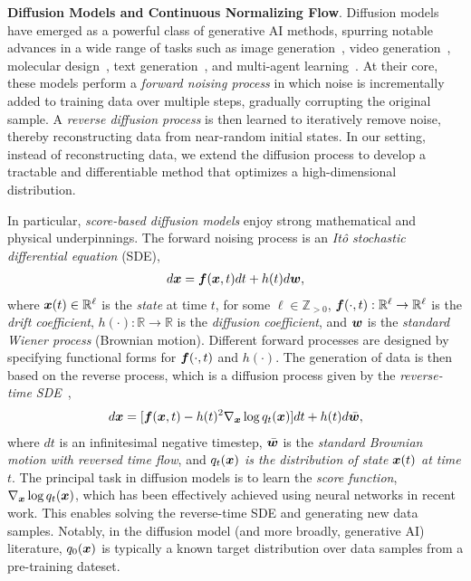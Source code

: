 

\textbf{Diffusion Models and Continuous Normalizing Flow}. Diffusion models have  emerged as a powerful class of generative AI methods, spurring notable advances in a wide range of tasks such as image generation~\cite{rombach2022high,esser2024scaling}, video generation~\cite{ho2022video,ceylan2023pix2video,ho2022imagen}, molecular design~\cite{gruver2024protein}, text generation~\cite{lou2024discrete}, and multi-agent learning~\cite{wang2024diffusion}. At their core, these models perform a {\em forward noising process} in which noise is incrementally added to training data over multiple steps, gradually corrupting the original sample.
%
A {\em reverse diffusion process} is then learned to iteratively remove noise, thereby reconstructing data from near-random initial states. In our setting, instead of reconstructing data, we extend the diffusion process to develop a tractable and differentiable method that optimizes a high-dimensional distribution.

In particular, {\em score-based diffusion models} enjoy strong mathematical and physical underpinnings. The forward noising process is an {\em Itô stochastic differential equation} (SDE),
\begin{align}
    d{\bm{x}} = {\bm{f}}({\bm{x}},t)dt + h(t)d{\bm{w}},
\end{align}
%
where ${\bm{x}}(t) \in\mathbb{R}^\ell$ is the {\em state} at time $t$, for some $\ell\in \mathbb{Z}_{>0}$, ${\bm{f}}(\cdot,t):\mathbb{R}^\ell\rightarrow\mathbb{R}^\ell$ is the {\em drift coefficient}, $h(\cdot):\mathbb{R}\rightarrow\mathbb{R}$ is the {\em diffusion coefficient}, and ${\bm{w}}$ is the {\em standard Wiener process} (Brownian motion). Different forward processes are designed by specifying functional forms for ${\bm{f}}(\cdot,t)$ and $h(\cdot)$. The generation of data is then based on the reverse process, which is  a diffusion process  given by the {\em reverse-time SDE}~\cite{anderson1982reverse},
%
\begin{align}
    d{\bm{x}} = [{\bm{f}}({\bm{x}},t)-h(t)^2\nabla_{\bm{x}}\log q_t({\bm{x}})]dt + h(t)d\bar{{\bm{w}}},\label{equ:r-sde}
\end{align}
%
where $dt$ is an infinitesimal negative timestep,  $\bar{{\bm{w}}}$ is the {\em standard Brownian motion with reversed time flow},  and {\em $q_t({\bm{x}})$ is the distribution of state  ${\bm{x}}(t)$
at time $t$}.
The principal task in diffusion models is to learn the {\em score function}, $\nabla_{\bm{x}}\log q_t({\bm{x}})$, which has been effectively achieved using neural networks in recent work. This
enables solving the reverse-time SDE and  generating new data samples.  Notably, in the diffusion model  (and more broadly, generative AI) literature, $q_0({\bm{x}})$ is typically a known target distribution over data samples from a pre-training dateset.

